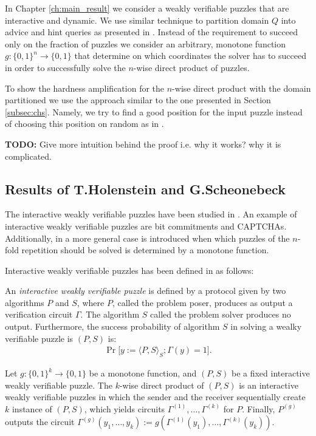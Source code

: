 In Chapter \ref{ch:main_result} we consider a weakly verifiable puzzles that are interactive and dynamic.
We use similar technique to partition domain $Q$ into advice and hint queries as presented in \cite{Dodis:2009:SAI:1530441.1530450}.
Instead of the requirement to succeed only on the fraction of puzzles we consider an arbitrary, monotone function $g : \{0,1\}^{n} \rightarrow \{0,1\}$
that determine on which coordinates the solver has to succeed in order to successfully solve the $n$-wise direct product of puzzles.

To show the hardness amplification for the $n$-wise direct product with the domain partitioned we use
the approach similar to the one presented in Section \ref{subsec:chs}. Namely, we try to find a good position for the input puzzle instead of
choosing this position on random as in \cite{Dodis:2009:SAI:1530441.1530450}.

\begin{todo}
  \textbf{TODO:} Give more intuition behind the proof i.e. why it works? why it is complicated.
\end{todo}

\subsection{Results of T.Holenstein and G.Scheonebeck}
The interactive weakly verifiable puzzles have been studied in \cite{DBLP:journals/corr/abs-1002-3534}.
An example of interactive weakly verifiable puzzles are bit commitments and CAPTCHAs.
Additionally, in \cite{DBLP:journals/corr/abs-1002-3534} a more general case is introduced when
which puzzles of the $n$-fold repetition should be solved is determined by a monotone function.

Interactive weakly verifiable puzzles has been defined in \cite{DBLP:journals/corr/abs-1002-3534} as follows:
\begin{definition}
An \textit{interactive weakly verifiable puzzle} is defined by a protocol given by two algorithms $P$ and $S$,
where $P$, called the problem poser, produces as output a verification circuit $\Gamma$. The algorithm $S$ called the problem solver
produces no output.
Furthermore, the \textnormal{success probability} of algorithm $S$ in solving a wealky verifiable puzzle is $(P,S)$ is:
\begin{align*}
  \Pr\Big[y := \langle P,S \rangle_{S}; \Gamma(y) = 1 \Big].
\end{align*}
\end{definition}
\begin{definition}
Let $g: \{0,1\}^{k} \rightarrow \{0,1\}$ be a monotone function, and $(P,S)$ be a fixed interactive weakly verifiable puzzle.
The $k$-wise direct product of $(P,S)$ is an interactive weakly verifiable puzzles in which the sender and the receiver
sequentially create $k$ instance of $(P,S)$, which yields circuits $\Gamma^{(1)}, \dotsc, \Gamma^{(k)}$ for $P$.
Finally, $P^{(g)}$ outputs the circuit $\Gamma^{(g)}(y_1, \dotsc, y_k) := g(\Gamma^{(1)}(y_1), \dotsc, \Gamma^{(k)}(y_k))$.
\end{definition}


